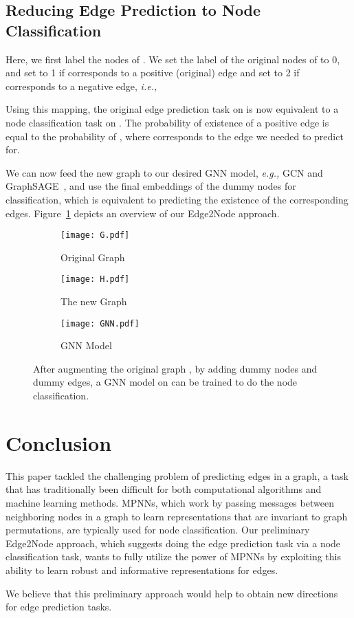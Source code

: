 \documentclass{article}
\begin{document}
\subsection{Reducing Edge Prediction to Node Classification}\label{algo}
Here, we first label the nodes of . We set the label  of the original nodes  of  to 0, and set  to 1 if  corresponds to a positive (original) edge and set  to 2 if  corresponds to a negative edge, \emph{i.e.,}



Using this mapping, the original edge prediction task on  is now equivalent to a node classification task on . The probability of existence of a positive edge  is equal to the probability of , where  corresponds to the edge  we needed to predict for.

We can now feed the new graph  to our desired GNN model, \emph{e.g.,} GCN and GraphSAGE~\cite{kipf2016semi,hamilton2017inductive}, and use the final embeddings of the dummy nodes for classification, which is equivalent to predicting the existence of the corresponding edges. Figure~\ref{fig:coffee} depicts an overview of our Edge2Node approach.



\begin{figure}[h!]
  \centering
    \begin{subfigure}[b]{0.3\linewidth}
    \texttt{[image: G.pdf]}
    \caption{Original Graph }
  \end{subfigure}
  \hspace{5mm}
    \begin{subfigure}[b]{0.35\linewidth}
    \texttt{[image: H.pdf]}
    \caption{The new Graph }
  \end{subfigure}
  \hspace{5mm}
    \begin{subfigure}[b]{0.25\linewidth}
    \texttt{[image: GNN.pdf]}
    \caption{GNN Model}
  \end{subfigure}
  \caption{After augmenting the original graph , by adding dummy nodes and dummy edges, a GNN model on  can be trained to do the node classification.}
  \label{fig:coffee}
\end{figure}




\section{Conclusion}
This paper tackled the challenging problem of predicting edges in a graph, a task that has traditionally been difficult for both computational algorithms and machine learning methods.
MPNNs, which work by passing messages between neighboring nodes in a graph to learn representations that are invariant to graph permutations, are typically used for node classification. Our preliminary Edge2Node approach, which suggests doing the edge prediction task via a node classification task, wants to fully utilize the power of MPNNs by exploiting this ability to learn robust and informative representations for edges.

We believe that this preliminary approach would help to obtain new directions for edge prediction tasks.



  
  
\end{document}

